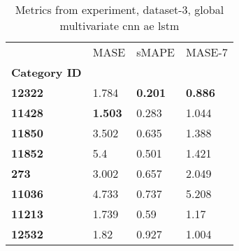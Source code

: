 \begin{table}[H]
\centering
\caption{Metrics from experiment, dataset-3, global multivariate cnn ae lstm}
\label{table:global-multivariate-cnn-ae-lstm-dataset-3}
\begin{tabular}{llll}
\toprule
{} &            MASE &           sMAPE &          MASE-7 \\
\textbf{Category ID} &                 &                 &                 \\
\midrule
\textbf{12322      } &           1.784 &  \textbf{0.201} &  \textbf{0.886} \\
\textbf{11428      } &  \textbf{1.503} &           0.283 &           1.044 \\
\textbf{11850      } &           3.502 &           0.635 &           1.388 \\
\textbf{11852      } &             5.4 &           0.501 &           1.421 \\
\textbf{273        } &           3.002 &           0.657 &           2.049 \\
\textbf{11036      } &           4.733 &           0.737 &           5.208 \\
\textbf{11213      } &           1.739 &            0.59 &            1.17 \\
\textbf{12532      } &            1.82 &           0.927 &           1.004 \\
\bottomrule
\end{tabular}
\end{table}
